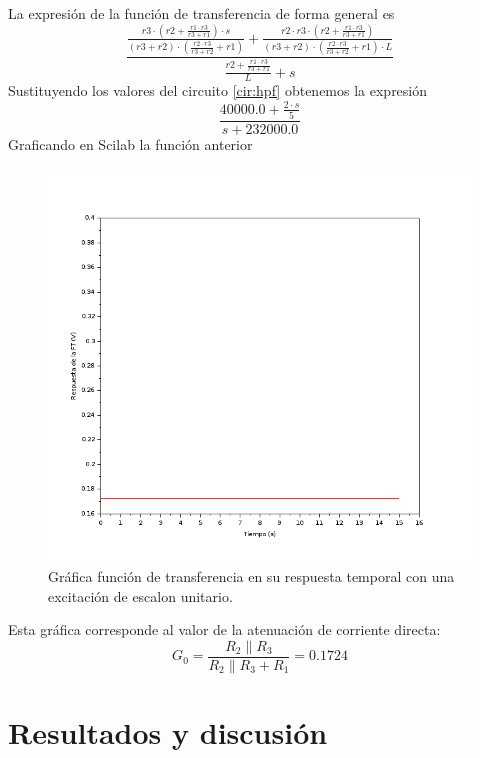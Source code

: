 \documentclass[letterpaper,11pt]{article}
\begin{document}
		La expresión de la función de transferencia de forma general es
		\[\frac{\frac{\mathit{r3}\cdot \left( \mathit{r2}+\frac{\mathit{r1}\cdot \mathit{r3}}{\mathit{r3}+\mathit{r1}}\right) \cdot s}{\left( \mathit{r3}+\mathit{r2}\right) \cdot \left( \frac{\mathit{r2}\cdot \mathit{r3}}{\mathit{r3}+\mathit{r2}}+\mathit{r1}\right) }+\frac{\mathit{r2}\cdot \mathit{r3}\cdot \left( \mathit{r2}+\frac{\mathit{r1}\cdot \mathit{r3}}{\mathit{r3}+\mathit{r1}}\right) }{\left( \mathit{r3}+\mathit{r2}\right) \cdot \left( \frac{\mathit{r2}\cdot \mathit{r3}}{\mathit{r3}+\mathit{r2}}+\mathit{r1}\right) \cdot L}}{\frac{\mathit{r2}+\frac{\mathit{r1}\cdot \mathit{r3}}{\mathit{r3}+\mathit{r1}}}{L}+s}\]
		Sustituyendo los valores del circuito \ref{cir:hpf} obtenemos la expresión
		\[\frac{40000.0+\frac{2\cdot s}{5}}{s+232000.0}\]
		Graficando en Scilab la función anterior
		\begin{figure}[h!]
			\centering	
			\includegraphics[width=\linewidth]{grafFT}
			\caption{Gráfica función de transferencia en su respuesta temporal con una excitación de escalon unitario.}
			\label{fig:grafFT}
		\end{figure}
		Esta gráfica corresponde al valor de la atenuación de corriente directa:
		\[G_0 = \frac{R_2 \parallel R_3}{R_2 \parallel R_3 + R_1} = 0.1724\]
		\FloatBarrier
		\section{Resultados y discusión}
\end{document}
